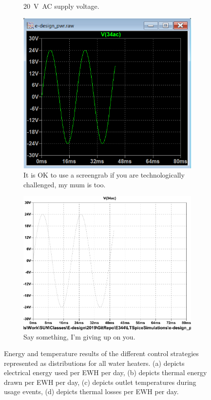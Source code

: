 \begin{figure}
\begin{subfigure}[]{0.45\textwidth}
		    \caption{\SI{20}{\volt AC} supply voltage.}
     \end{subfigure}
     \begin{subfigure}[]{0.45\textwidth} 
             \centering
         \includegraphics[width=1.\linewidth]{./Figures/Screengrab.png}
		\caption{It is OK to use a screengrab if you are technologically challenged, my mum is too. }
     \end{subfigure}
     \begin{subfigure}[]{0.45\textwidth}
             \centering
  		\includegraphics[width=1.0\linewidth]{./Figures/e-design_pwr_ac.pdf}
		   \caption{Say something, I'm giving up on you. }
     \end{subfigure}
   \caption[I am the short caption for the list of figures]{Energy and temperature results of the different control strategies represented as distributions for all water heaters. (a) depicts  electrical energy used per EWH per day, (b) depicts thermal energy drawn per EWH per day, (c) depicts outlet temperatures during usage events, (d) depicts thermal losses per EWH per day. }
    \label{fig:simulation_results_box}
 \end{figure}

